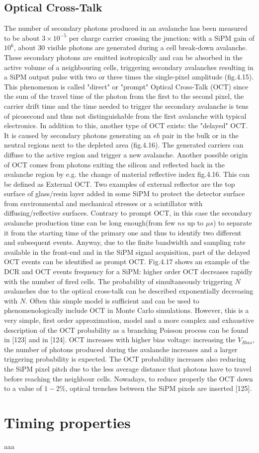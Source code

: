 \subsection{Optical Cross-Talk}
The number of secondary photons produced in an avalanche has been measured to be about $3\times 10^{-5}$ per charge carrier crossing the junction:  with a SiPM gain of $10^6$, about $30$ visible photons are generated during a cell break-down avalanche.
These secondary photons are emitted isotropically and can be absorbed in the active volume of a neighbouring cells, triggering secondary avalanches resulting in a SiPM output pulse with two or three times the single-pixel amplitude (fig.4.15).
This phenomenon is called "direct" or "prompt" Optical Cross-Talk (OCT) since the sum of the travel time of the photon from the first to the second pixel, the carrier drift time and the time needed to trigger the secondary avalanche is tens of picosecond and thus not distinguishable from the first avalanche with typical electronics.
In addition to this, another type of OCT exists:  the "delayed" OCT.
It is caused by secondary photons generating an \textit{eh} pair in the bulk or in the neutral regions next to the depleted area (fig.4.16).
The generated carriers can diffuse to the active region and trigger a new avalanche.
Another possible origin of OCT comes from photons exiting the silicon and reflected back in the avalanche region by e.g. the change of material reflective index fig.4.16.
This can be defined as External OCT.
Two examples of external reflector are the top surface of glass/resin layer added in some SiPM to protect the detector surface from environmental and mechanical stresses or a scintillator with diffusing/reflective surfaces.
Contrary to prompt OCT, in this case the secondary avalanche production time can be long enough(from few $ns$ up to $\mu s$) to separate it from the starting time of the primary one and thus to identify two different and subsequent events.
Anyway, due to the finite bandwidth and sampling rate available in the front-end and in the SiPM signal acquisition, part of the delayed OCT events can be identified as prompt OCT.
Fig.4.17 shows an example of the DCR and OCT events frequency for a SiPM: higher order OCT decreases rapidly with the number of fired cells.
The probability of simultaneously triggering $N$ avalanches due to the optical cross-talk can be described exponentially decreasing with $N$. Often this simple model is sufficient and can be used to phenomenologically include OCT in Monte Carlo simulations.
However, this is a very simple, first order approximation, model and a more complex and exhaustive description of the OCT probability as a branching Poisson process can be found in [123] and in [124].
OCT increases with higher bias voltage: increasing the $V_{Bias}$, the number of photons produced during the avalanche increases and a larger triggering probability is expected.
The OCT probability increases also reducing the SiPM pixel pitch due to the less average distance that photons have to travel before reaching the neighbour cells.
Nowadays, to reduce properly the OCT down to a value of $1-2\%$, optical trenches between the SiPM pixels are inserted [125].

\section{Timing properties}
aaa